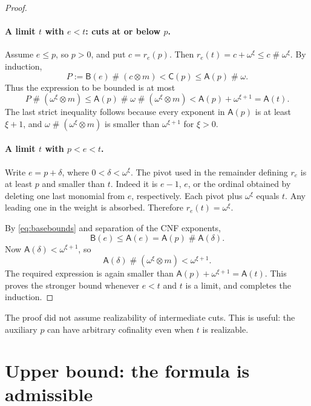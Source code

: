 \documentclass[11pt,a4paper]{article}
\theoremstyle{definition}
\newcommand{\ns}{\mathbin{\#}}
\newcommand{\nprod}{\mathbin{\otimes}}
\newcommand{\FunA}{\mathsf A}
\newcommand{\FunB}{\mathsf B}
\newcommand{\FunC}{\mathsf C}
\begin{document}
\begin{proof}
\paragraph{A limit $t$ with $e<t$: cuts at or below $p$.}
Assume $e\le p$, so $p>0$, and put $c=r_e(p)$. Then
$r_e(t)=c+\omega^\xi\le c\ns\omega^\xi$. By induction,
\[
 P:=\FunB(e)\ns(c\nprod m)<\FunC(p)\le\FunA(p)\ns\omega.
\]
Thus the expression to be bounded is at most
\[
 P\ns(\omega^\xi\nprod m)
 \le\FunA(p)\ns\omega\ns(\omega^\xi\nprod m)
 <\FunA(p)+\omega^{\xi+1}=\FunA(t).
\]
The last strict inequality follows because every exponent in $\FunA(p)$
is at least $\xi+1$, and $\omega\ns(\omega^\xi\nprod m)$ is smaller than
$\omega^{\xi+1}$ for $\xi>0$.

\paragraph{A limit $t$ with $p<e<t$.}
Write $e=p+\delta$, where $0<\delta<\omega^\xi$.
The pivot used in the remainder defining $r_e$ is at least $p$ and smaller
than $t$. Indeed it is $e-1$, $e$, or the ordinal obtained by deleting one
last monomial from $e$, respectively. Each pivot plus $\omega^\xi$ equals
$t$. Any leading one in the weight is absorbed. Therefore
$r_e(t)=\omega^\xi$.

By \eqref{eq:basebounds} and separation of the CNF exponents,
\[
 \FunB(e)\le\FunA(e)=\FunA(p)\ns\FunA(\delta).
\]
Now $\FunA(\delta)<\omega^{\xi+1}$, so
\[
 \FunA(\delta)\ns(\omega^\xi\nprod m)<\omega^{\xi+1}.
\]
The required expression is again smaller than
$\FunA(p)+\omega^{\xi+1}=\FunA(t)$.
This proves the stronger bound whenever $e<t$ and $t$ is a limit, and
completes the induction.
\end{proof}

The proof did not assume realizability of intermediate cuts. This is useful:
the auxiliary $p$ can have arbitrary cofinality even when $t$ is realizable.

\section{Upper bound: the formula is admissible}\label{sec:upper}
\end{document}
